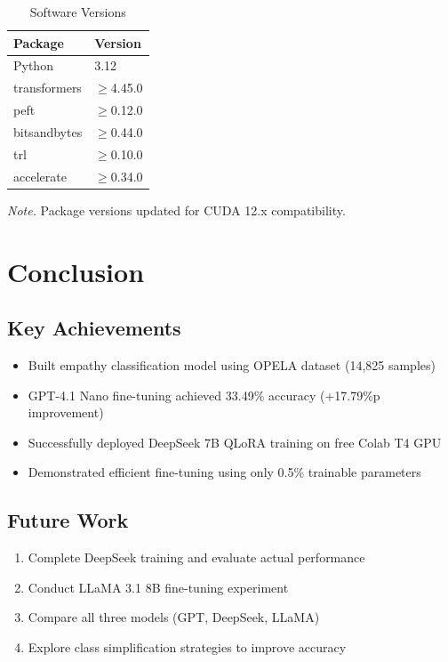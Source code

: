 \documentclass[11pt, a4paper]{article}
\begin{document}
\begin{table}[H]
\centering
\caption{Software Versions}
\label{tab:software}
\begin{tabular}{ll}
\toprule
\textbf{Package} & \textbf{Version} \\
\midrule
Python & 3.12 \\
transformers & $\geq$4.45.0 \\
peft & $\geq$0.12.0 \\
bitsandbytes & $\geq$0.44.0 \\
trl & $\geq$0.10.0 \\
accelerate & $\geq$0.34.0 \\
\bottomrule
\end{tabular}

\vspace{0.5em}
\footnotesize\textit{Note.} Package versions updated for CUDA 12.x compatibility.
\end{table}

\section{Conclusion}

\subsection{Key Achievements}
\begin{itemize}
    \item Built empathy classification model using OPELA dataset (14,825 samples)
    \item GPT-4.1 Nano fine-tuning achieved 33.49\% accuracy (+17.79\%p improvement)
    \item Successfully deployed DeepSeek 7B QLoRA training on free Colab T4 GPU
    \item Demonstrated efficient fine-tuning using only 0.5\% trainable parameters
\end{itemize}

\subsection{Future Work}
\begin{enumerate}
    \item Complete DeepSeek training and evaluate actual performance
    \item Conduct LLaMA 3.1 8B fine-tuning experiment
    \item Compare all three models (GPT, DeepSeek, LLaMA)
    \item Explore class simplification strategies to improve accuracy
\end{enumerate}
\end{document}
